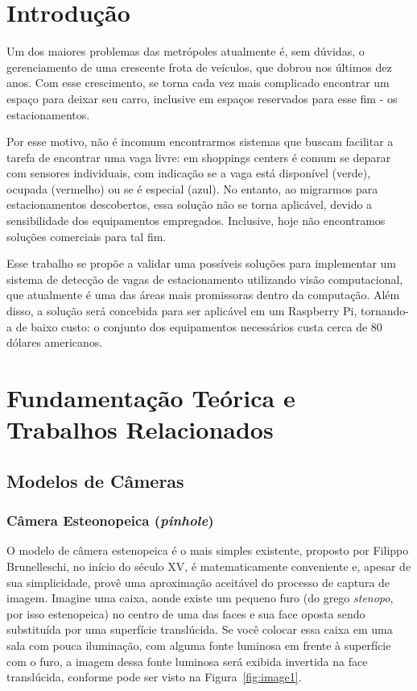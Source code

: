 \documentclass[ecp,tc]{iiufrgs}
\begin{document}
\listoffigures

\listoftables

\tableofcontents


\chapter{Introdução}
Um dos maiores problemas das metrópoles atualmente é, sem dúvidas, o gerenciamento de uma crescente frota de veículos, que dobrou nos últimos dez anos. Com esse crescimento, se torna cada vez mais complicado encontrar um espaço para deixar seu carro, inclusive em espaços reservados para esse fim - os estacionamentos. 

Por esse motivo, não é incomum encontrarmos sistemas que buscam facilitar a tarefa de encontrar uma vaga livre: em shoppings centers é comum se deparar com sensores individuais, com indicação se a vaga está disponível (verde), ocupada (vermelho) ou se é especial (azul). No entanto, ao migrarmos para estacionamentos descobertos, essa solução não se torna aplicável, devido a sensibilidade dos equipamentos empregados. Inclusive, hoje não encontramos soluções comerciais para tal fim.

Esse trabalho se propõe a validar uma possíveis soluções para implementar um sistema de detecção de vagas de estacionamento utilizando visão computacional, que atualmente é uma das áreas mais promissoras dentro da computação. Além disso, a solução será concebida para ser aplicável em um Raspberry Pi, tornando-a de baixo custo: o conjunto dos equipamentos necessários custa cerca de 80 dólares americanos.

\chapter{Fundamentação Teórica e Trabalhos Relacionados}

\section{Modelos de Câmeras}

\subsection{Câmera Esteonopeica (\textit{pinhole})}
O  modelo  de  câmera  estenopeica  é  o  mais  simples  existente,  proposto  por  Filippo Brunelleschi, no início do século XV, é matematicamente conveniente e, apesar de sua simplicidade, provê uma aproximação aceitável do processo de captura de imagem. Imagine uma caixa, aonde existe um pequeno furo (do grego \textit{stenopo}, por isso estenopeica) no centro de uma das faces e sua face oposta sendo substituída por uma superfície translúcida. Se você colocar essa caixa em uma sala com pouca iluminação, com alguma fonte luminosa em frente à superfície com o furo, a imagem dessa fonte luminosa será exibida invertida na face translúcida, conforme pode ser visto na Figura~\ref{fig:image1}.
\end{document}
